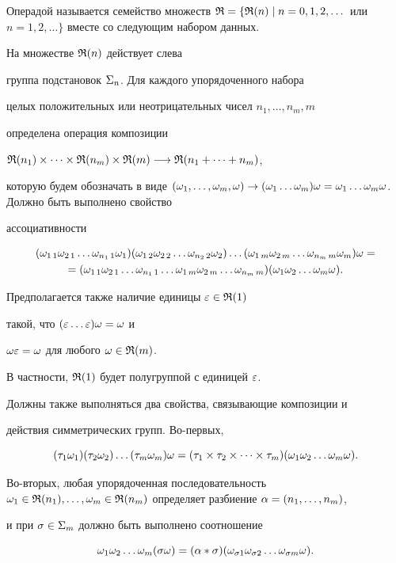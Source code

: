 \begin{defn}


Операдой называется семейство множеств $\R=\{\R(n)\mid


n=0,1,2,\dotsc$ или $n=1,2,\dotsc\}$ вместе со следующим набором данных.


На множестве ${\frak R}(n)$ действует слева


группа подстановок $\Sigma_n$. Для каждого упорядоченного набора


целых положительных или неотрицательных чисел $n_1,\dotsc,n_m,m$


определена операция композиции


$\R({n_1})\times \dotsb \times \R({n_m})\times \R(m) \ar{}


\R({n_1+\dotsb +n_m})$,


которую будем обозначать в виде $(\o_1,\dotsc, \o_m,\o)\to


(\o_1\dotsc\o_m)\o=\o_1\dotsc\o_m\o$. Должно быть выполнено свойство


ассоциативности


\begin{multline*}


(\o_{1\,1}\o_{2\,1}\dotsc\o_{n_1\,1}\o_1)


(\o_{1\,2}\o_{2\,2}\dotsc\o_{n_2\,2}\o_2)\dotsc


(\o_{1\,m}\o_{2\,m}\dotsc\o_{n_m\,m}\o_m)\o =\\


=(\o_{1\,1}\o_{2\,1}\dotsc\o_{n_1\,1}\dotsc


\o_{1\,m}\o_{2\,m}\dotsc\o_{n_m\,m})(\o_1\o_2\dotsc \o_m\o).


\end{multline*}


Предполагается также наличие единицы $\varepsilon\in{\frak R}(1)$


такой, что $(\varepsilon\dotsc\varepsilon)\omega=\omega$ и


$\omega\varepsilon=\omega$ для любого $\omega\in{\frak R}(m)$.


В частности, ${\frak R}(1)$ будет полугруппой с единицей $\varepsilon$.


Должны также выполняться два свойства, связывающие композиции и


действия симметрических групп. Во-первых,


$$


(\t_1\o_1)(\t_2\o_2)\dotsc (\t_m\o_m)\o=


(\t_1\times\t_2\times\dotsb\times \t_m)(\o_1\o_2\dotsc\o_m\o).


$$


Во-вторых, любая упорядоченная последовательность $\o_1\in \R({n_1}),


\dotsc ,\o_m\in \R({n_m})$ определяет разбиение $\al=(n_1,\dotsc,n_m)$,


и при $\sigma\in \Sigma_m$ должно быть выполнено соотношение


$$


\o_1\o_2\dotsc\o_m(\s\o)=


(\al * \s)(\o_{\s 1}\o_{\s 2}\dotsc\o_{\s m}\o).


$$


\end{defn}
